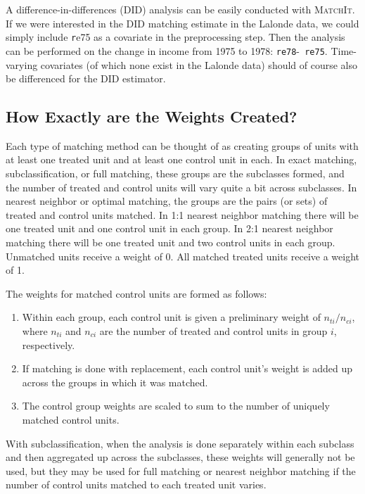 \documentclass[oneside,letterpaper,titlepage]{article}
\newcommand{\MatchIt}{\textsc{MatchIt}}
\begin{document}
A difference-in-differences (DID) analysis can be easily conducted
with \MatchIt.  If we were interested in the DID matching estimate in
the Lalonde data, we could simply include {\texttt re75} as a
covariate in the preprocessing step.  Then the analysis can be
performed on the change in income from 1975 to 1978: {\tt re78}-{\tt
  re75}.  Time-varying covariates (of which none exist in the Lalonde
data) should of course also be differenced for the DID estimator.

\subsection{How Exactly are the Weights Created?}
\label{subsec:weights}

Each type of matching method can be thought of as creating groups of
units with at least one treated unit and at least one control unit in
each.  In exact matching, subclassification, or full matching, these
groups are the subclasses formed, and the number of treated and
control units will vary quite a bit across subclasses.  In nearest
neighbor or optimal matching, the groups are the pairs (or sets) of
treated and control units matched.  In 1:1 nearest neighbor matching
there will be one treated unit and one control unit in each group.  In
2:1 nearest neighbor matching there will be one treated unit and two
control units in each group.  Unmatched units receive a weight of 0.
All matched treated units receive a weight of 1.

The weights for matched control units are formed as follows:
\begin{enumerate}
\item Within each group, each control unit is given a preliminary
  weight of $n_{ti}/n_{ci}$, where $n_{ti}$ and $n_{ci}$ are the
  number of treated and control units in group $i$, respectively.
\item If matching is done with replacement, each control unit's weight
  is added up across the groups in which it was matched.
\item The control group weights are scaled to sum to the number of
  uniquely matched control units.
\end{enumerate}

With subclassification, when the analysis is done separately within
each subclass and then aggregated up across the subclasses, these
weights will generally not be used, but they may be used for full
matching or nearest neighbor matching if the number of control units
matched to each treated unit varies.
\end{document}
